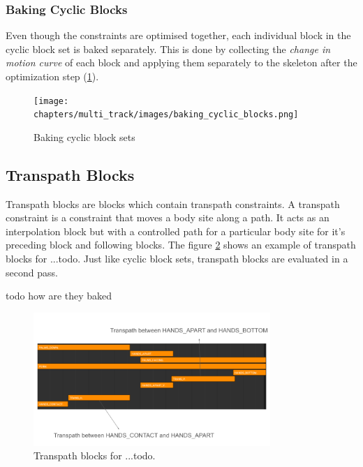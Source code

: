 \documentclass[../../main.tex]{subfiles}
\begin{document}
\subsubsection{Baking Cyclic Blocks}
\label{ch:multi_track:second_pass:cyclic_blocks:baking_cyclic_blocks}

Even though the constraints are optimised together, each individual block in the cyclic block set is baked separately. This is done by collecting the \emph{change in motion curve} of each block and applying them separately to the skeleton after the optimization step (\ref{fig:baking_cyclic_blocks}).

\begin{figure}
    \centering
    \texttt{[image: chapters/multi\_track/images/baking\_cyclic\_blocks.png]}
    \caption{Baking cyclic block sets}
    \label{fig:baking_cyclic_blocks}
\end{figure}

\subsection{Transpath Blocks}
\label{ch:multi_track:second_pass:transpath_blocks}

Transpath blocks are blocks which contain transpath constraints. A transpath constraint is a constraint that moves a body site along a path. It acts as an interpolation block but with a controlled path for a particular body site for it's preceding block and following blocks. The figure \ref{fig:transpath_blocks} shows an example of transpath blocks for ...todo. Just like cyclic block sets, transpath blocks are evaluated in a second pass.

todo how are they baked 

\begin{figure}[h]
    \centering
    \includegraphics[width=0.8\textwidth]{chapters/multi_track/images/transpath_blocks.png}
    \caption{Transpath blocks for ...todo.}
    \label{fig:transpath_blocks}
\end{figure}
\end{document}
